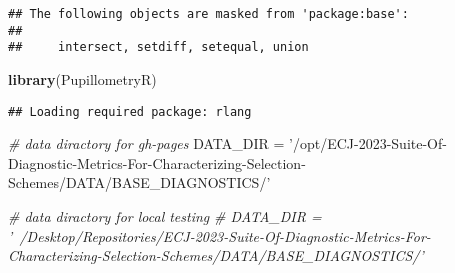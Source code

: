 \documentclass[]{book}
\newenvironment{Shaded}{\begin{snugshade}}{\end{snugshade}}
\newcommand{\CommentTok}[1]{\textcolor[rgb]{0.56,0.35,0.01}{\textit{#1}}}
\newcommand{\KeywordTok}[1]{\textcolor[rgb]{0.13,0.29,0.53}{\textbf{#1}}}
\newcommand{\NormalTok}[1]{#1}
\newcommand{\StringTok}[1]{\textcolor[rgb]{0.31,0.60,0.02}{#1}}
\begin{document}
\begin{verbatim}
## The following objects are masked from 'package:base':
## 
##     intersect, setdiff, setequal, union
\end{verbatim}

\begin{Shaded}
\begin{Highlighting}[]
\KeywordTok{library}\NormalTok{(PupillometryR)}
\end{Highlighting}
\end{Shaded}

\begin{verbatim}
## Loading required package: rlang
\end{verbatim}

\begin{Shaded}
\begin{Highlighting}[]
\CommentTok{# data diractory for gh-pages}
\NormalTok{DATA_DIR =}\StringTok{ '/opt/ECJ-2023-Suite-Of-Diagnostic-Metrics-For-Characterizing-Selection-Schemes/DATA/BASE_DIAGNOSTICS/'}

\CommentTok{# data diractory for local testing}
\CommentTok{# DATA_DIR = '~/Desktop/Repositories/ECJ-2023-Suite-Of-Diagnostic-Metrics-For-Characterizing-Selection-Schemes/DATA/BASE_DIAGNOSTICS/'}


\end{Highlighting}
\end{Shaded}
\end{document}
